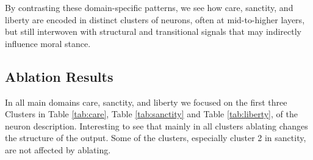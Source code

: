 \documentclass[runninghheads]{llncs}
\begin{document}
By contrasting these domain-specific patterns, we see how care, sanctity, and liberty are encoded in distinct clusters of neurons, often at mid-to-higher layers, but still interwoven with structural and transitional signals that may indirectly influence moral stance.


\subsection{Ablation Results}

In all main domains care, sanctity, and liberty we focused on the first three Clusters in Table \ref{tab:care}, Table \ref{tab:sanctity} and Table \ref{tab:liberty},  of the neuron description. Interesting to see that mainly in all clusters ablating changes the structure of the output. Some of the clusters, especially cluster 2 in sanctity, are not affected by ablating. 
\end{document}

